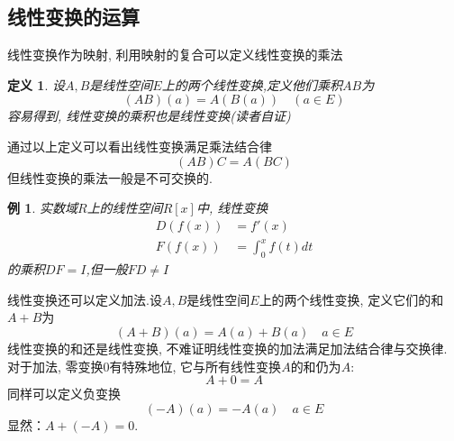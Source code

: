 \documentclass{book}
\newtheorem{definition}{\hspace{2em}定义}[section]
\newtheorem{example}{例}[section]
\begin{document}
\subsection*{线性变换的运算}
线性变换作为映射, 利用映射的复合可以定义线性变换的乘法
\begin{definition}
  设$A,B$是线性空间$E$上的两个线性变换,定义他们乘积$AB$为
  \begin{equation*}
    (AB)(a)=A(B(a))\quad (a\in E)
  \end{equation*}
  容易得到, 线性变换的乘积也是线性变换(读者自证)
\end{definition}
通过以上定义可以看出线性变换满足乘法结合律
\begin{equation*}
  (AB)C=A(BC)
\end{equation*}
但线性变换的乘法一般是不可交换的.
\begin{example}
  实数域$R$上的线性空间$R[x]$中, 线性变换
  \begin{equation*}
    \begin{split}
       D(f(x))&=f'(x)\\
       F(f(x))&=\int_{0}^{x}f(t)dt
    \end{split}
  \end{equation*}
  的乘积$DF=I$,但一般$FD\neq I$
\end{example}
线性变换还可以定义加法.设$A,B$是线性空间$E$上的两个线性变换, 定义它们的和$A+B$为
\begin{equation*}
  (A+B)(a)=A(a)+B(a)\quad a\in E
\end{equation*}
线性变换的和还是线性变换, 不难证明线性变换的加法满足加法结合律与交换律. 对于加法, 零变换$0$有特殊地位, 它与所有线性变换$A$的和仍为$A$:
\begin{equation*}
  A+0=A
\end{equation*}
同样可以定义负变换
\begin{equation*}
  (-A)(a)=-A(a)\quad a\in E
\end{equation*}
显然：$A+(-A)=0$.
\end{document}
